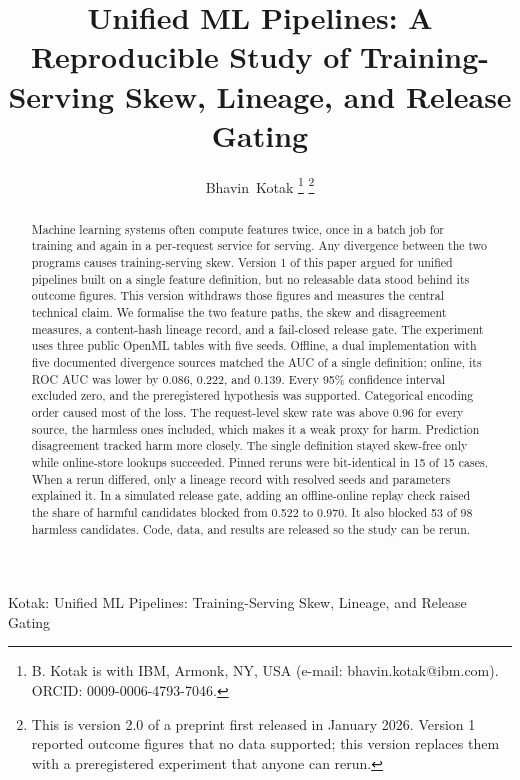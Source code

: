 \documentclass[journal]{IEEEtran}
\begin{document}
\title{Unified ML Pipelines: A Reproducible Study of Training-Serving Skew, Lineage, and Release Gating}

\author{Bhavin~Kotak%
\thanks{B. Kotak is with IBM, Armonk, NY, USA (e-mail: bhavin.kotak@ibm.com). ORCID: 0009-0006-4793-7046.}%
\thanks{This is version 2.0 of a preprint first released in January 2026. Version 1 reported outcome figures that no data supported; this version replaces them with a preregistered experiment that anyone can rerun.}%
}

%
{Kotak: Unified ML Pipelines: Training-Serving Skew, Lineage, and Release Gating}

\maketitle

\begin{abstract}
Machine learning systems often compute features twice, once in a batch job for training and again in a per-request service for serving. Any divergence between the two programs causes training-serving skew. Version 1 of this paper argued for unified pipelines built on a single feature definition, but no releasable data stood behind its outcome figures. This version withdraws those figures and measures the central technical claim. We formalise the two feature paths, the skew and disagreement measures, a content-hash lineage record, and a fail-closed release gate. The experiment uses three public OpenML tables with five seeds. Offline, a dual implementation with five documented divergence sources matched the AUC of a single definition; online, its ROC AUC was lower by 0.086, 0.222, and 0.139. Every 95\% confidence interval excluded zero, and the preregistered hypothesis was supported. Categorical encoding order caused most of the loss. The request-level skew rate was above 0.96 for every source, the harmless ones included, which makes it a weak proxy for harm. Prediction disagreement tracked harm more closely. The single definition stayed skew-free only while online-store lookups succeeded. Pinned reruns were bit-identical in 15 of 15 cases. When a rerun differed, only a lineage record with resolved seeds and parameters explained it. In a simulated release gate, adding an offline-online replay check raised the share of harmful candidates blocked from 0.522 to 0.970. It also blocked 53 of 98 harmless candidates. Code, data, and results are released so the study can be rerun.
\end{abstract}
\end{document}
